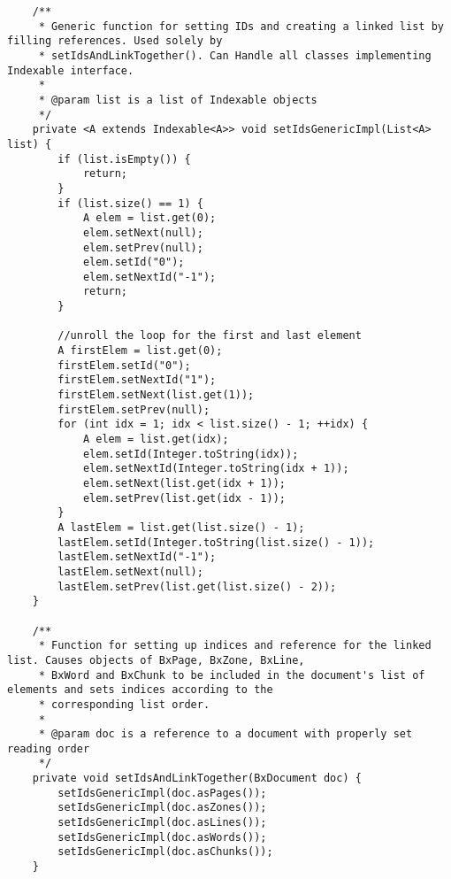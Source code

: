\begin{appendices}
\begin{lstlisting}
    /**
     * Generic function for setting IDs and creating a linked list by filling references. Used solely by
     * setIdsAndLinkTogether(). Can Handle all classes implementing Indexable interface.
     *
     * @param list is a list of Indexable objects
     */
    private <A extends Indexable<A>> void setIdsGenericImpl(List<A> list) {
        if (list.isEmpty()) {
            return;
        }
        if (list.size() == 1) {
            A elem = list.get(0);
            elem.setNext(null);
            elem.setPrev(null);
            elem.setId("0");
            elem.setNextId("-1");
            return;
        }

        //unroll the loop for the first and last element
        A firstElem = list.get(0);
        firstElem.setId("0");
        firstElem.setNextId("1");
        firstElem.setNext(list.get(1));
        firstElem.setPrev(null);
        for (int idx = 1; idx < list.size() - 1; ++idx) {
            A elem = list.get(idx);
            elem.setId(Integer.toString(idx));
            elem.setNextId(Integer.toString(idx + 1));
            elem.setNext(list.get(idx + 1));
            elem.setPrev(list.get(idx - 1));
        }
        A lastElem = list.get(list.size() - 1);
        lastElem.setId(Integer.toString(list.size() - 1));
        lastElem.setNextId("-1");
        lastElem.setNext(null);
        lastElem.setPrev(list.get(list.size() - 2));
    }

    /**
     * Function for setting up indices and reference for the linked list. Causes objects of BxPage, BxZone, BxLine,
     * BxWord and BxChunk to be included in the document's list of elements and sets indices according to the
     * corresponding list order.
     *
     * @param doc is a reference to a document with properly set reading order
     */
    private void setIdsAndLinkTogether(BxDocument doc) {
        setIdsGenericImpl(doc.asPages());
        setIdsGenericImpl(doc.asZones());
        setIdsGenericImpl(doc.asLines());
        setIdsGenericImpl(doc.asWords());
        setIdsGenericImpl(doc.asChunks());
    }


\end{lstlisting}
\end{appendices}
